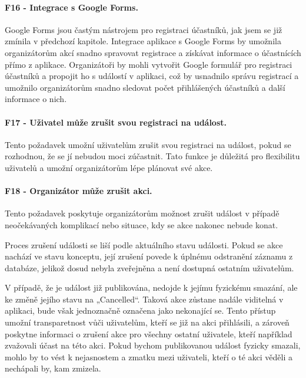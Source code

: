\paragraph{F16 - Integrace s Google Forms.}\label{req:F16}
Google Forms jsou častým nástrojem pro registraci účastníků, jak jsem se již zmínila v předchozí kapitole. Integrace aplikace s Google Forms by umožnila organizátorům akcí snadno spravovat registrace a získávat informace o účastnících přímo z aplikace. Organizátoři by mohli vytvořit Google formulář pro registraci účastníků a propojit ho s událostí v aplikaci, což by usnadnilo správu registrací a umožnilo organizátorům snadno sledovat počet přihlášených účastníků a další informace o nich.

\paragraph{F17 - Uživatel může zrušit svou registraci na událost.}\label{req:F17}
Tento požadavek umožní uživatelům zrušit svou registraci na
událost, pokud se rozhodnou, že se jí nebudou moci zúčastnit. Tato funkce je důležitá pro flexibilitu uživatelů a umožní organizátorům lépe plánovat své akce.

\paragraph{F18 - Organizátor může zrušit akci.}\label{req:F18}
Tento požadavek poskytuje organizátorům možnost zrušit událost v případě neočekávaných komplikací nebo situace, kdy se akce nakonec nebude konat.

Proces zrušení události se liší podle aktuálního stavu události. Pokud se akce nachází ve stavu konceptu, její zrušení povede k úplnému odstranění záznamu z databáze, jelikož dosud nebyla zveřejněna a není dostupná ostatním uživatelům.

V případě, že je událost již publikována, nedojde k jejímu fyzickému smazání, ale ke změně jejího stavu na „Cancelled“. Taková akce zůstane nadále viditelná v aplikaci, bude však jednoznačně označena jako nekonající se. Tento přístup umožní transparetnost vůči uživatelům, kteří se již na akci přihlásili, a zároveň poskytne informaci o zrušení akce pro všechny ostatní uživatele, kteří například zvažovali účast na této akci. Pokud bychom publikovanou událost fyzicky smazali, mohlo by to vést k nejasnostem a zmatku mezi uživateli, kteří o té akci věděli a nechápali by, kam zmizela. 

